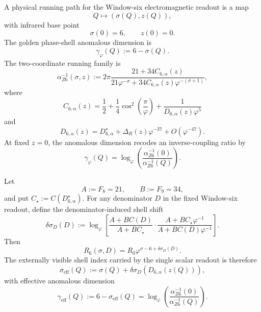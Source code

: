 \begin{definition}
\label{def:zeckendorf-golden-phase-shell-anomalous-dimension}
A physical running path for the Window-six electromagnetic readout is a
map
$$
  Q\longmapsto(\sigma(Q),z(Q)),
$$
with infrared base point
$$
  \sigma(0)=6,\qquad z(0)=0.
$$
The golden phase-shell anomalous dimension is
$$
  \gamma_\varphi(Q):=6-\sigma(Q).
$$
The two-coordinate running family is
$$
  \alpha_{Z6}^{-1}(\sigma,z)
  :=
  2\pi
  \frac{
    21+34C_{6,\alpha}(z)
  }{
    21\varphi^{-\sigma}
    +
    34C_{6,\alpha}(z)\varphi^{-(\sigma+1)}
  },
$$
where
$$
  C_{6,\alpha}(z)
  =
  \frac12
  +
  \frac14\cos^2\left(\frac{\pi}{\varphi}\right)
  +
  \frac{1}{D_{6,\alpha}(z)\varphi^5}
$$
and
$$
  D_{6,\alpha}(z)
  =
  D_{6,\alpha}^{\star}
  +
  \Delta_R(z)\varphi^{-37}
  +
  O(\varphi^{-47}).
$$
At fixed $z=0$, the anomalous dimension recodes an inverse-coupling
ratio by
$$
  \gamma_\varphi(Q)
  =
  \log_\varphi
  \left(
    \frac{\alpha_{Z6}^{-1}(0)}
         {\alpha_{Z6}^{-1}(Q)}
  \right).
$$
\end{definition}

\begin{definition}
\label{def:zeckendorf-effective-observable-shell-index}
Let
$$
  A:=F_8=21,\qquad B:=F_9=34,
$$
and put $C_\star:=C(D_{6,\alpha}^{\star})$. For any denominator $D$ in
the fixed Window-six readout, define the denominator-induced shell shift
$$
  \delta\sigma_D(D)
  :=
  \log_\varphi
  \left[
    \frac{A+BC(D)}{A+BC_\star}
    \cdot
    \frac{A+BC_\star\varphi^{-1}}
         {A+BC(D)\varphi^{-1}}
  \right].
$$
Then
$$
  R_6(\sigma,D)
  =
  R_0\varphi^{\sigma-6+\delta\sigma_D(D)}.
$$
The externally visible shell index carried by the single scalar
readout is therefore
$$
  \sigma_{\mathrm{eff}}(Q)
  :=
  \sigma(Q)+\delta\sigma_D(D_{6,\alpha}(z(Q))),
$$
with effective anomalous dimension
$$
  \gamma_{\mathrm{eff}}(Q)
  :=
  6-\sigma_{\mathrm{eff}}(Q)
  =
  \log_\varphi
  \left(
    \frac{\alpha^{-1}_{Z6}(0)}
         {\alpha^{-1}_{Z6}(Q)}
  \right).
$$
\end{definition}

